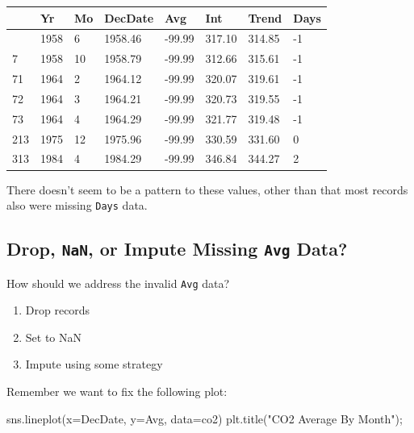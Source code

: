 \documentclass[
  letterpaper,
  DIV=11,
  numbers=noendperiod]{scrreprt}
\newenvironment{Shaded}{\begin{snugshade}}{\end{snugshade}}
\newcommand{\NormalTok}[1]{\textcolor[rgb]{0.00,0.23,0.31}{#1}}
\newcommand{\OperatorTok}[1]{\textcolor[rgb]{0.37,0.37,0.37}{#1}}
\newcommand{\StringTok}[1]{\textcolor[rgb]{0.13,0.47,0.30}{#1}}
\providecommand{\tightlist}{%
  \setlength{\itemsep}{0pt}\setlength{\parskip}{0pt}}\usepackage{longtable,booktabs,array}
\begin{document}
\begin{longtable}[]{@{}llllllll@{}}
\toprule\noalign{}
& Yr & Mo & DecDate & Avg & Int & Trend & Days \\
\midrule\noalign{}
\endhead
\bottomrule\noalign{}
\endlastfoot
3 & 1958 & 6 & 1958.46 & -99.99 & 317.10 & 314.85 & -1 \\
7 & 1958 & 10 & 1958.79 & -99.99 & 312.66 & 315.61 & -1 \\
71 & 1964 & 2 & 1964.12 & -99.99 & 320.07 & 319.61 & -1 \\
72 & 1964 & 3 & 1964.21 & -99.99 & 320.73 & 319.55 & -1 \\
73 & 1964 & 4 & 1964.29 & -99.99 & 321.77 & 319.48 & -1 \\
213 & 1975 & 12 & 1975.96 & -99.99 & 330.59 & 331.60 & 0 \\
313 & 1984 & 4 & 1984.29 & -99.99 & 346.84 & 344.27 & 2 \\
\end{longtable}

There doesn't seem to be a pattern to these values, other than that most
records also were missing \texttt{Days} data.

\subsection{\texorpdfstring{Drop, \texttt{NaN}, or Impute Missing
\texttt{Avg}
Data?}{Drop, NaN, or Impute Missing Avg Data?}}\label{drop-nan-or-impute-missing-avg-data}

How should we address the invalid \texttt{Avg} data?

\begin{enumerate}
\def\labelenumi{\arabic{enumi}.}
\tightlist
\item
  Drop records
\item
  Set to NaN
\item
  Impute using some strategy
\end{enumerate}

Remember we want to fix the following plot:

\begin{Shaded}
\begin{Highlighting}[]
\NormalTok{sns.lineplot(x}\OperatorTok{=}\StringTok{\textquotesingle{}DecDate\textquotesingle{}}\NormalTok{, y}\OperatorTok{=}\StringTok{\textquotesingle{}Avg\textquotesingle{}}\NormalTok{, data}\OperatorTok{=}\NormalTok{co2)}
\NormalTok{plt.title(}\StringTok{"CO2 Average By Month"}\NormalTok{)}\OperatorTok{;}
\end{Highlighting}
\end{Shaded}
\end{document}
